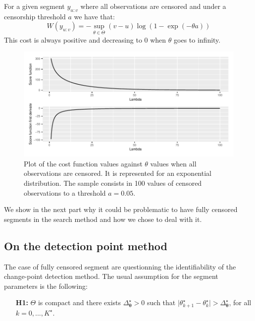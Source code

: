 For a given segment $y_{u:v}$ where all observations are censored and under a censorship threshold $a$ we have that: 
\begin{equation} \label{chp:4:costex}
W(y_{u:v}) = -\sup_{\theta \in \Theta}(v-u)\log(1-\exp(-\theta a)) 
\end{equation}
This cost is always positive and decreasing to 0 when $\theta$  goes to infinity. 

\begin{figure}[ht]
    \centering
    \includegraphics{figs/Chap4/only_cens.pdf}
    \caption{Plot of the cost function values against $\theta$ values when all observations are censored. It is represented for an exponential distribution. The sample consists in 100 values of censored observations to a threshold $a = 0.05$.}
    \label{fig:onlycens}
\end{figure}

We show in the next part why it could be problematic to have fully censored segments in the search method and how we chose to deal with it. 

\subsection{On the detection point method}

The case of fully censored segment are questionning the identifiability of the change-point detection method. The usual assumption \citep{Lavielle1997} for the segment parameters is the following:   
\begin{itemize}
\item[\textbf{H1:}] $\Theta$ is compact and there exists $\Delta_{\bm \theta}^{\star}>0$ such that $\vert \theta_{k+1}^{\star}-\theta_{k}^{\star}\vert > \Delta_{\bm \theta}^{\star}$, for all $k=0,...,K^{\star}$. 
\end{itemize}


